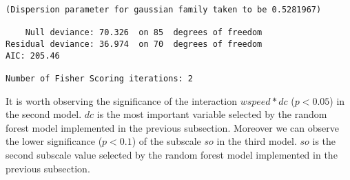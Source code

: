 \documentclass[11pt, a4paper, twoside, openright]{article}
\begin{document}
\begin{enumerate}
\begin{verbatim}
(Dispersion parameter for gaussian family taken to be 0.5281967)

    Null deviance: 70.326  on 85  degrees of freedom
Residual deviance: 36.974  on 70  degrees of freedom
AIC: 205.46

Number of Fisher Scoring iterations: 2
\end{verbatim}
\end{enumerate}
It is worth observing the significance of the interaction $wspeed*dc$
($p<0.05$) in the second model. $dc$ is the most important variable
selected by the random forest model implemented in the previous
subsection. Moreover we can observe the lower significance ($p<0.1$)
of the subscale $so$ in the third model. $so$ is the second subscale
value selected by the random forest model implemented in the previous
subsection.
\end{document}
